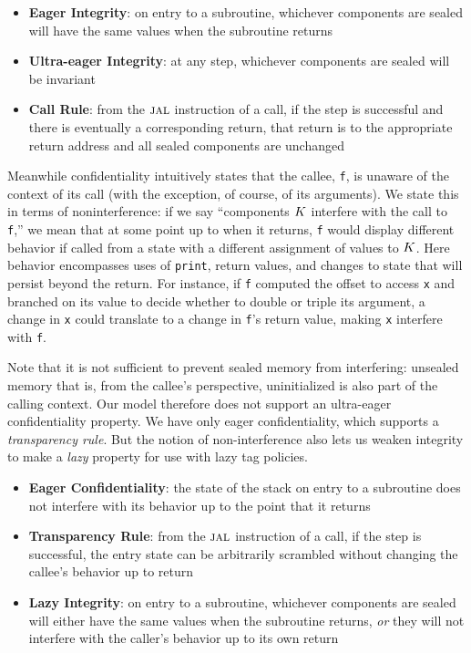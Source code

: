 \begin{itemize}
\item {\bf Eager Integrity}: on entry to a subroutine, whichever components are
  sealed will have the same values when the subroutine returns
\item {\bf Ultra-eager Integrity}: at any step, whichever components are sealed
  will be invariant
\item {\bf Call Rule}: from the \(\textsc{jal}\) instruction of a call, if the step is
  successful and there is eventually a corresponding return, that return is to
  the appropriate return address and all sealed components are unchanged
\end{itemize}

Meanwhile confidentiality intuitively states that the callee, {\tt f}, is unaware
of the context of its call (with the exception, of course, of its arguments).
We state this in terms of noninterference: if we say ``components \(K\)
interfere with the call to {\tt f},'' we mean that at some point up to when it returns,
{\tt f} would display different behavior if called from a state with a different
assignment of values to \(K\). Here behavior encompasses uses of {\tt print},
return values, and changes to state that will persist beyond the return.
For instance, if {\tt f} computed the offset to access {\tt x} and branched on its value
to decide whether to double or triple its argument, a change in {\tt x} could translate
to a change in {\tt f}'s return value, making {\tt x} interfere with {\tt f}.

Note that it is not sufficient to prevent sealed memory from interfering: unsealed
memory that is, from the callee's perspective, uninitialized is also part of the calling
context. Our model therefore does not support an ultra-eager confidentiality property.
We have only eager confidentiality, which supports a {\em transparency rule}. But the
notion of non-interference also lets us weaken integrity to make a {\em lazy} property
for use with lazy tag policies.

\begin{itemize}
\item {\bf Eager Confidentiality}: the state of the stack on entry to a subroutine
  does not interfere with its behavior up to the point that it returns
\item {\bf Transparency Rule}: from the \(\textsc{jal}\) instruction of a call, if the step is
  successful, the entry state can be arbitrarily scrambled without changing the callee's
  behavior up to return
\item {\bf Lazy Integrity}:  on entry to a subroutine, whichever components are
  sealed will either have the same values when the subroutine returns, {\em or} they will
  not interfere with the caller's behavior up to its own return
\end{itemize}
